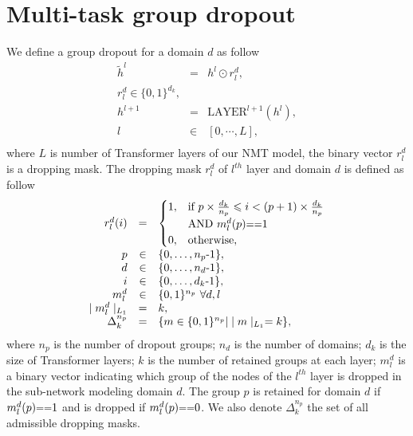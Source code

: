 \documentclass[11pt]{article}
\begin{document}
\section{Multi-task group dropout}
We define a group dropout for a domain $d$ as follow
\begin{equation}
\begin{array}{rcl}
\tilde{h}^l &=& h^l \odot r_l^d ,\\
r_l^d \in \{ 0,1 \}^{d_k}, \\
h^{l+1} &=& \text{LAYER}^{l+1}(h^l) ,\\
l & \in & [0,\cdots,L] ,\\
\end{array}
\end{equation}
where $L$ is number of Transformer layers of our NMT model, the binary vector $r_l^d$ is a dropping mask. The dropping mask $r_l^d$ of $l^{th}$ layer and domain $d$ is defined as follow
\begin{equation}
\begin{array}{rcl}
r_l^d(i) &=& \begin{cases}
      1, & \text{if}\ p \times \frac{d_k}{n_p} \leqslant i < (p+1) \times \frac{d_k}{n_p} \\
      & \text{AND} \  m_l^d(p) \text{\small ==} 1 \\
      0, & \text{otherwise},
    \end{cases} \\
p & \in & \{0,\dots,n_p\text{-}1 \}, \\
d & \in & \{0,\dots,n_d\text{-}1 \}, \\
i & \in & \{0,\dots,d_k\text{-}1 \}, \\
m_l^d & \in & \{0,1\}^{n_p} \ \forall d,l \, \\
\mid m_l^d \mid_{L_1} & = & k , \\
\Delta^{n_p}_k & = & \{ m \in \{0,1\}^{n_p} | \mid m \mid_{L_1} = k \},
\end{array}
\end{equation}
where $n_p$ is the number of dropout groups; $n_d$ is the number of domains; $d_k$ is the size of Transformer layers; $k$ is the number of retained groups at each layer; $m_l^d$ is a binary vector indicating which group of the nodes of the $l^{th}$ layer is dropped in the sub-network modeling domain $d$. The group $p$ is retained for domain $d$ if $m_l^d(p)\text{\small ==}1$ and is dropped if $m_l^d(p)\text{\small ==}0$. We also denote $\Delta^{n_p}_k$ the set of all admissible dropping masks. 
\end{document}
